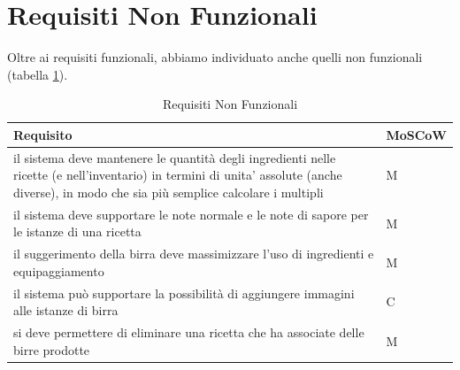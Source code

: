 \documentclass[a4paper,12pt]{report}
\begin{document}
	\section{Requisiti Non Funzionali}
	Oltre ai requisiti funzionali, abbiamo individuato anche quelli non funzionali (tabella \ref{tab:Requisiti-Non-Funzionali}). 
    		\begin{table}[!h]
      			\renewcommand{\arraystretch}{1.2}
      			\begin{tabular}{p{}|p{}} 
        				\textbf{Requisito}  & \textbf{MoSCoW} \\
    				\hline
                                  il sistema deve mantenere le quantità degli ingredienti nelle ricette (e nell'inventario) in termini di unita' assolute (anche diverse), in modo che sia più semplice calcolare i multipli & M \\
                                  il sistema deve supportare le note normale e le note di sapore per le istanze di una ricetta  & M \\
                                  il suggerimento della birra deve massimizzare l'uso di ingredienti e equipaggiamento & M \\
                                  il sistema può supportare la possibilità di aggiungere immagini alle istanze di birra & C \\
                                  si deve permettere di eliminare una ricetta che ha associate delle birre prodotte & M \\
        			\end{tabular}
        			\caption{Requisiti Non Funzionali}
      			\label{tab:Requisiti-Non-Funzionali}
    		\end{table}	
	
	
    \newpage
\end{document}
